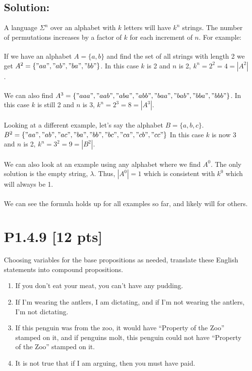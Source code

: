 \documentclass[12pt]{article}
\begin{document}
\subsection*{\textbf{Solution:}}
A language $\Sigma^n$ over an alphabet with $k$ letters will have $k^n$ strings. The number of permutations increases by a factor of $k$ for each increment of $n$. For example:
\\\\If we have an alphabet $A = \{a,b\}$ and find the set of all strings with length 2 we get $A^2 = \{"aa", "ab", "ba", "bb"\}$. In this case $k$ is 2 and $n$ is 2, $k^n = 2^2 = 4 = |A^2|$.
\\\\We can also find $A^3 = \{"aaa", "aab", "aba", "abb", "baa", "bab", "bba", "bbb"\}$. In this case $k$ is still 2 and $n$ is 3, $k^n = 2^3 = 8 = |A^3|$.
\\\\ Looking at a different example, let's say the alphabet $B = \{a,b,c\}$. $B^2 = \{"aa", "ab", "ac", \\"ba", "bb", "bc", "ca", "cb", "cc"\}$ In this case $k$ is now 3 and $n$ is 2, $k^n = 3^2 = 9 = |B^2|$.
\\\\ We can also look at an example using any alphabet where we find $A^0$. The only solution is the empty string, $ \lambda$. Thus, $|A^0| = 1$ which is consistent with $k^0$ which will always be 1.
\\\\We can see the formula holds up for all examples so far, and likely will for others.



\newpage
\section*{\textbf{P1.4.9} [12 pts]}
Choosing variables for the base propositions as needed, translate these English statements into compound propositions.
\begin{enumerate}[label=(\alph*)]
    \item If you don’t eat your meat, you can’t have any pudding.
\item If I’m wearing the antlers, I am dictating, and if I’m not wearing the antlers, I’m not dictating.
\item If this penguin was from the zoo, it would have “Property of the Zoo” stamped on it, and if penguins molt, this penguin could not have “Property of the Zoo” stamped on it.
\item It is not true that if I am arguing, then you must have paid.
\end{enumerate}
\end{document}
